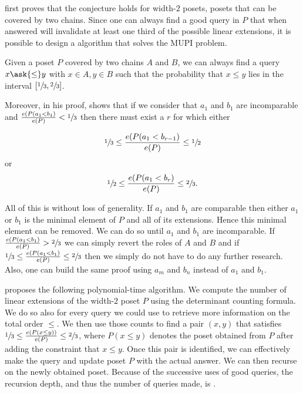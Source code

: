 \citet*{linial:1984} first proves that the \onethirdtwothird conjecture holds
for width-\(2\) posets, \ie posets that can be covered by two chains. Since one
can always find a good query in \(P\) that when answered will invalidate at
least one third of the possible linear extensions, it is possible to design a
 algorithm that solves the MUPI problem.

\begin{theorem}
Given a poset \(P\) covered by two chains \(A\) and \(B\), we can always find
a query \(x \ask{\le} y\) with \(x \in A, y \in B\) such that the probability
that \(x \le y\) lies in the interval \([\sfrac{1}{3}, \sfrac{2}{3}]\).
\end{theorem}

Moreover, in his proof, \citet*{linial:1984} shows that if we consider that \(
a_1\) and \(b_1\) are incomparable and \(\frac{e(P(a_1 < b_1)}{e(P)} <
\sfrac{1}{3}\) then there must exist a \(r\) for which either

\begin{displaymath}
\sfrac{1}{3} \le \frac{e(P(a_1 < b_{r-1})}{e(P)} \le \sfrac{1}{2}
\end{displaymath}
or
\begin{displaymath}
\sfrac{1}{2} \le \frac{e(P(a_1 < b_{r})}{e(P)} \le \sfrac{2}{3}.
\end{displaymath}

All of this is without loss of generality. If \(a_1\) and \(b_1\) are
comparable then either \(a_1\) or \(b_1\) is the minimal element of \(P\) and
all of its extensions. Hence this minimal element can be removed. We can do so
until \(a_1\) and \(b_1\) are incomparable. If \(\frac{e(P(a_1 < b_1)}{e(P)} >
\sfrac{2}{3}\) we can simply revert the roles of \(A\) and \(B\) and if
\(\sfrac{1}{3} \le \frac{e(P(a_1 < b_1)}{e(P)} \le \sfrac{2}{3}\) then we
simply do not have to do any further research. Also, one can build the same
proof using \(a_m\) and \(b_n\) instead of \(a_1\) and \(b_1\).

\citet*{linial:1984} proposes the following polynomial-time algorithm. We
compute the number of linear extensions of the width-\(2\) poset \(P\) using
the determinant counting formula. We do so also for every query we could use to
retrieve more information on the total order \(\le\). We then use those counts
to find a pair \((x,y)\) that satisfies \(\sfrac{1}{3} \le \frac{e(P(x \le
y))}{e(P)} \le \sfrac{2}{3}\), where \(P(x \le y)\) denotes the poset obtained
from \(P\) after adding the constraint that \(x \le y\). Once this pair is
identified, we can effectively make the query and update poset \(P\) with the
actual answer. We can then recurse on the newly obtained poset. Because of the
successive uses of good queries, the recursion depth, and thus the number of
queries made, is .

